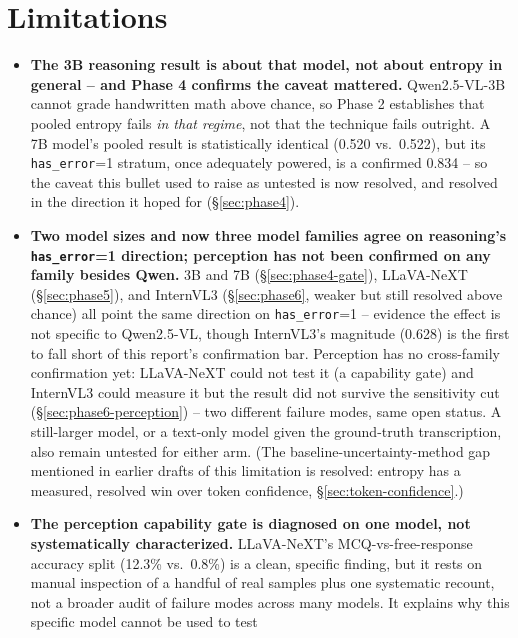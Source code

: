 \documentclass[11pt]{article}
\begin{document}
\section{Limitations}

\begin{itemize}
  \item \textbf{The 3B reasoning result is about that model, not about
    entropy in general -- and Phase 4 confirms the caveat mattered.}
    Qwen2.5-VL-3B cannot grade handwritten math above chance, so Phase 2
    establishes that pooled entropy fails \emph{in that regime}, not that
    the technique fails outright. A 7B model's pooled result is statistically
    identical (0.520 vs.\ 0.522), but its \texttt{has\_error}=1 stratum,
    once adequately powered, is a confirmed 0.834 -- so the caveat this
    bullet used to raise as untested is now resolved, and resolved in the
    direction it hoped for (\S\ref{sec:phase4}).
  \item \textbf{Two model sizes and now three model families agree on
    reasoning's \texttt{has\_error}=1 direction; perception has not been
    confirmed on any family besides Qwen.} 3B and 7B (\S\ref{sec:phase4-gate}),
    LLaVA-NeXT (\S\ref{sec:phase5}), and InternVL3 (\S\ref{sec:phase6},
    weaker but still resolved above chance) all point the same direction on
    \texttt{has\_error}=1 -- evidence the effect is not specific to
    Qwen2.5-VL, though InternVL3's magnitude (0.628) is the first to fall
    short of this report's confirmation bar. Perception has no cross-family
    confirmation yet: LLaVA-NeXT could not test it (a capability gate) and
    InternVL3 could measure it but the result did not survive the
    sensitivity cut (\S\ref{sec:phase6-perception}) -- two different
    failure modes, same open status. A still-larger model, or a text-only
    model given the ground-truth transcription, also remain untested for
    either arm. (The baseline-uncertainty-method gap mentioned in earlier
    drafts of this limitation is resolved: entropy has a measured, resolved
    win over token confidence, \S\ref{sec:token-confidence}.)
  \item \textbf{The perception capability gate is diagnosed on one model,
    not systematically characterized.} LLaVA-NeXT's MCQ-vs-free-response
    accuracy split (12.3\% vs.\ 0.8\%) is a clean, specific finding, but it
    rests on manual inspection of a handful of real samples plus one
    systematic recount, not a broader audit of failure modes across many
    models. It explains why this specific model cannot be used to test

\end{itemize}
\end{document}
